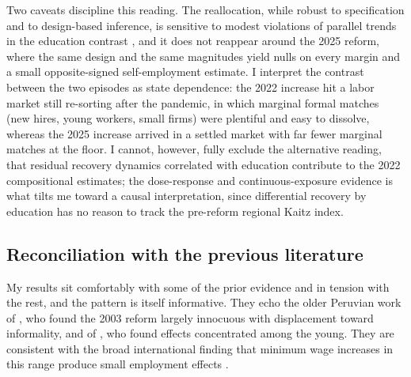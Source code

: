 Two caveats discipline this reading. The reallocation, while robust to specification and
to design-based inference, is sensitive to modest violations of parallel trends in the
education contrast \citep{rambachan_roth_2023}, and it does not reappear around the 2025
reform, where the same design and the same magnitudes yield nulls on every margin and a
small opposite-signed self-employment estimate. I interpret the contrast between the two
episodes as state dependence: the 2022 increase hit a labor market still re-sorting after
the pandemic, in which marginal formal matches (new hires, young workers, small
firms) were plentiful and easy to dissolve, whereas the 2025 increase arrived in a
settled market with far fewer marginal matches at the floor. I cannot, however, fully
exclude the alternative reading, that residual recovery dynamics correlated with
education contribute to the 2022 compositional estimates; the dose-response and
continuous-exposure evidence is what tilts me toward a causal interpretation, since
differential recovery by education has no reason to track the pre-reform regional Kaitz
index.

\subsection{Reconciliation with the previous literature}

My results sit comfortably with some of the prior evidence and in tension with the rest, and
the pattern is itself informative. They echo the older Peruvian work of
\citet{jaramillo_lopez_2006}, who found the 2003 reform largely innocuous with displacement
toward informality, and of \citet{cespedes_2005}, who found effects concentrated among the
young. They are consistent with the broad international finding that minimum wage increases in
this range produce small employment effects \citep{card_krueger_1995, cengiz_2019}.

